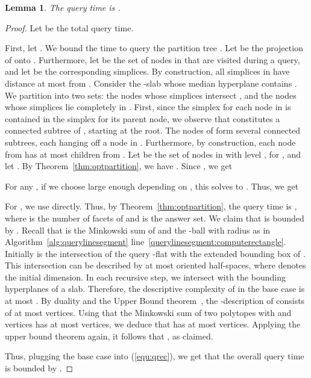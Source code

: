 \documentclass[a4paper,11pt]{paper}
\newtheorem{lemma}[theorem]{Lemma}
\begin{document}
\begin{lemma}
  \label{lem:querytime}
  The query time is .
\end{lemma}
\begin{proof}
  Let  be the total query time.

  First, let .
  We bound the time to query the partition tree .
  Let  be the projection of  onto .
  Furthermore, let  be the set of nodes in  that
  are visited during a query, and let  be the
  corresponding
  simplices. By construction, all simplices in 
  have distance at most  from .
  Consider the -slab  whose
  median hyperplane contains .
  We partition  into two sets: the nodes
   whose simplices intersect , and the nodes
   whose simplices lie completely in .
  First, since the simplex for each node in  is
  contained in the simplex for its parent node, we observe that
   constitutes a connected subtree of , starting
  at the root.  The nodes of  form several connected subtrees,
  each hanging off a node in . Furthermore, by construction,
  each node from  has at most  children from .
  Let  be the set of nodes in  with level ,
  for ,
  and let .
  By Theorem~\ref{thm:optpartition}, we have
  . Since
  ,
  we get
  
  For any , if we choose
   large enough depending on , this solves to
  .
  Thus, we get
  

  \newcommand{\magicnumber}{((2k+2)(5d_0 - 2k)^{k/2})^{(k+1)/2}}
  For , we use  directly.
  Thus, by Theorem~\ref{thm:optpartition}, the query time 
  is , where
   is the number of facets of  and
   is the answer set.
  We claim that
   is bounded by .
  Recall that  is the Minkowski sum of  and
  the -ball with radius
   as in Algorithm~\ref{alg:querylinesegment}
  line~\ref{querylinesegment:computerectangle}.
  Initially  is the intersection of the query -flat with the
  extended bounding box of . This intersection can
  be described by at most
   oriented half-spaces, where  denotes
  the initial dimension. In each recursive
  step, we intersect  with the  bounding hyperplanes of a slab.
  Therefore, the descriptive complexity of  in the base case is
  at most . By duality and the Upper Bound
  theorem~\cite{Matousek02}, the -description of
   consists of at most  vertices. Using
  that the Minkowski sum of two
  polytopes with  and  vertices has at most
   vertices, we deduce that  has at
  most  vertices.
  Applying the upper bound theorem again, it follows that
  , as claimed.


  Thus, plugging the base case into (\ref{equ:qrec}),
  we get that the overall query time  is  bounded by
  .
\end{proof}
\end{document}
